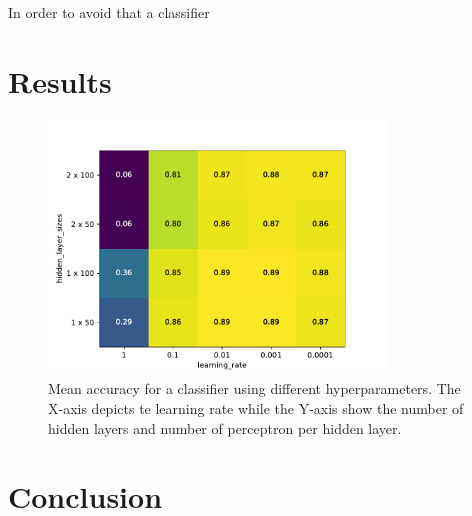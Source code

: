 \documentclass[sigconf]{acmart}
\begin{document}
In order to avoid that a classifier 

\section{Results}

\begin{figure}
	\centering
	\label{fig:heatmap}
	\includegraphics[width=9cm]{fig2.pdf}
	\caption{Mean accuracy for a classifier using different hyperparameters. The X-axis depicts te learning rate while the Y-axis show the number of hidden layers and number of perceptron per hidden layer.}
\end{figure}

\section{Conclusion}



\end{document}
